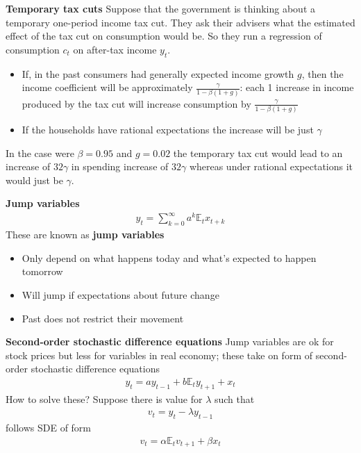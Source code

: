 \documentclass{beamer}
\begin{document}
\begin{frame}
  \textbf{Temporary tax cuts}
  Suppose that the government is thinking about a temporary one-period income tax cut. 
They ask their advisers what the estimated effect of the tax cut on consumption would be. 
So they run a regression of consumption $c_t$ on after-tax income $y_t$. 
\begin{itemize}
  \item If, in the past consumers had generally expected income growth $g$, then the income coefficient will be approximately $\frac{\gamma}{1-\beta(1+g)}$: each 1 increase in income produced by the tax cut will increase consumption by $\frac{\gamma}{1-\beta(1+g)}$
  \item If the households have rational expectations the increase will be just $\gamma$
\end{itemize}
In the case were $\beta=0.95$ and $g=0.02$ the temporary tax cut would lead to an increase of $32\gamma$ in spending increase of $32\gamma$ whereas under rational expectations it would just be $\gamma$.
\end{frame}

\begin{frame}
  \textbf{Jump variables}
  \begin{align}  
      y_t=\sum^{\infty}_{k=0}a^k\mathbb{E}_tx_{t+k} 
  \end{align}
  These are known as \textbf{jump variables}
  \begin{itemize}
  \item Only depend on what happens today and what's expected to happen tomorrow
  \item Will jump if expectations about future change
  \item Past does not restrict their movement
\end{itemize}
\end{frame}

\begin{frame}
  \textbf{Second-order stochastic difference equations}
  Jump variables are ok for stock prices but less for variables in real economy; these take on form of second-order stochastic difference equations
  \begin{align}  
    y_t=ay_{t-1} + b\mathbb{E}_ty_{t+1} + x_t 
  \end{align}
  How to solve these? Suppose there is value for $\lambda$ such that
  \begin{align}
    v_t=y_t-\lambda y_{t-1}  
  \end{align}
  follows SDE of form
  \begin{align}
  v_t=\alpha \mathbb{E}_tv_{t+1} + \beta x_t  
\end{align}
\end{frame}
\end{document}
